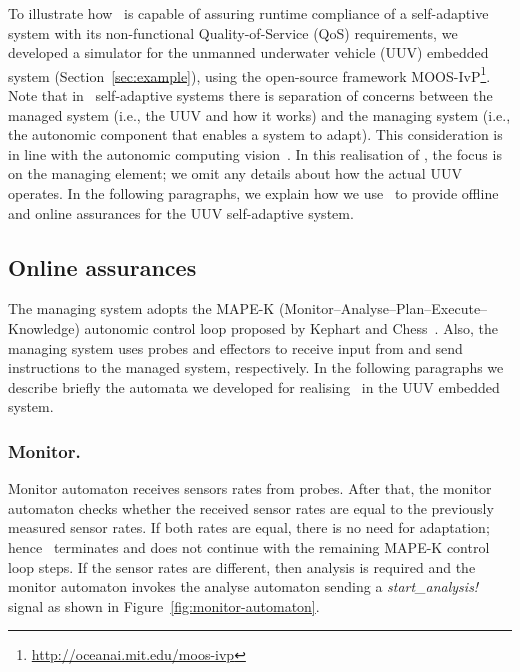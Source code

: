 To illustrate how \approach\ is capable of assuring runtime compliance of a self-adaptive system with its non-functional Quality-of-Service (QoS) requirements,  we developed a simulator for the  unmanned underwater vehicle (UUV) embedded system (Section~\ref{sec:example}), using the open-source framework MOOS-IvP\footnote{\url{http://oceanai.mit.edu/moos-ivp}}. Note that  in \approach\ self-adaptive systems there is separation of concerns between the managed system (i.e., the UUV and how it works) and the managing system (i.e., the autonomic component that enables a system to adapt). This consideration is in line with the autonomic computing vision~\cite{Kephart2003:Comp}. In this realisation of \approach, the focus is on the managing element; we omit any details about how the actual  UUV operates. In the following paragraphs, we explain how we use \approach\ to provide offline and online assurances for the UUV self-adaptive system.

\subsection{Online assurances}
The managing system adopts the MAPE-K (Monitor--Analyse--Plan--Execute--Knowledge) autonomic control loop proposed by Kephart and Chess~\cite{Kephart2003:Comp}. Also, the managing system uses probes and effectors to receive input from and send instructions to the managed system, respectively. In the following paragraphs we describe briefly the automata we developed for realising \approach\ in the UUV embedded system.

\subsubsection{Monitor.}
Monitor automaton receives sensors rates from probes. After that, the monitor automaton checks whether the received sensor rates are equal to the previously measured sensor rates. If both rates are equal, there is no need for adaptation; hence \approach\ terminates and does not continue with the remaining MAPE-K control loop steps. If the sensor rates are different, then analysis is required and the monitor automaton invokes the analyse automaton sending a \textit{start\_analysis!} signal as shown in Figure~\ref{fig:monitor-automaton}. 

